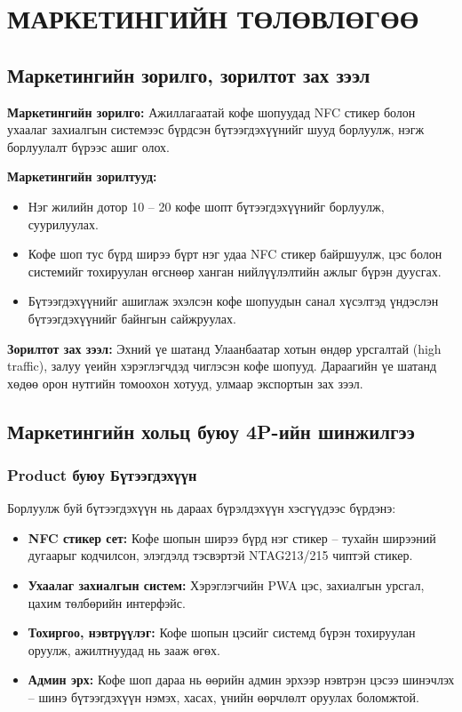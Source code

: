 \chapter{МАРКЕТИНГИЙН ТӨЛӨВЛӨГӨӨ}

\section{Маркетингийн зорилго, зорилтот зах зээл}

\textbf{Маркетингийн зорилго:} Ажиллагаатай кофе шопуудад NFC стикер
болон ухаалаг захиалгын системээс бүрдсэн бүтээгдэхүүнийг шууд
борлуулж, нэгж борлуулалт бүрээс ашиг олох.

\textbf{Маркетингийн зорилтууд:}

\begin{itemize}
  \item Нэг жилийн дотор 10 -- 20 кофе шопт бүтээгдэхүүнийг
        борлуулж, суурилуулах.
  \item Кофе шоп тус бүрд ширээ бүрт нэг удаа NFC стикер байршуулж,
        цэс болон системийг тохируулан өгснөөр ханган нийлүүлэлтийн
        ажлыг бүрэн дуусгах.
  \item Бүтээгдэхүүнийг ашиглаж эхэлсэн кофе шопуудын санал
        хүсэлтэд үндэслэн бүтээгдэхүүнийг байнгын сайжруулах.
\end{itemize}

\textbf{Зорилтот зах зээл:} Эхний үе шатанд Улаанбаатар хотын
өндөр урсгалтай (high traffic), залуу үеийн хэрэглэгчдэд чиглэсэн
кофе шопууд. Дараагийн үе шатанд хөдөө орон нутгийн томоохон
хотууд, улмаар экспортын зах зээл.

\section{Маркетингийн хольц буюу 4P-ийн шинжилгээ}

\subsection{Product буюу Бүтээгдэхүүн}

Борлуулж буй бүтээгдэхүүн нь дараах бүрэлдэхүүн хэсгүүдээс
бүрдэнэ:

\begin{itemize}
  \item \textbf{NFC стикер сет:} Кофе шопын ширээ бүрд нэг стикер --
        тухайн ширээний дугаарыг кодчилсон, элэгдэлд тэсвэртэй
        NTAG213/215 чиптэй стикер.
  \item \textbf{Ухаалаг захиалгын систем:} Хэрэглэгчийн PWA цэс,
        захиалгын урсгал, цахим төлбөрийн интерфэйс.
  \item \textbf{Тохиргоо, нэвтрүүлэг:} Кофе шопын цэсийг системд
        бүрэн тохируулан оруулж, ажилтнуудад нь зааж өгөх.
  \item \textbf{Админ эрх:} Кофе шоп дараа нь өөрийн админ эрхээр
        нэвтрэн цэсээ шинэчлэх -- шинэ бүтээгдэхүүн нэмэх, хасах,
        үнийн өөрчлөлт оруулах боломжтой.
\end{itemize}

